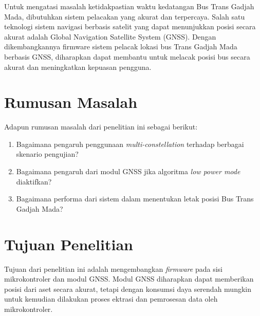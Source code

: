Untuk mengatasi masalah ketidakpastian waktu kedatangan Bus Trans Gadjah Mada, dibutuhkan sistem pelacakan yang akurat dan terpercaya. Salah satu teknologi sistem navigasi berbasis satelit yang dapat menunjukkan posisi secara akurat adalah Global Navigation Satellite System (GNSS). Dengan dikembangkannya firmware sistem pelacak lokasi bus Trans Gadjah Mada berbasis GNSS, diharapkan dapat membantu untuk melacak posisi bus secara akurat dan meningkatkan kepuasan pengguna.

\section{Rumusan Masalah}
Adapun rumusan masalah dari penelitian ini sebagai berikut:
\begin{enumerate}
	\item Bagaimana pengaruh penggunaan \textit{multi-constellation} terhadap berbagai skenario pengujian?
	\item Bagaimana pengaruh dari modul GNSS jika algoritma \textit{low power mode} diaktifkan?
	\item Bagaimana performa dari sistem dalam menentukan letak posisi Bus Trans Gadjah Mada?
\end{enumerate}

\section{Tujuan Penelitian}
Tujuan dari penelitian ini adalah mengembangkan \textit{firmware} pada sisi mikrokontroler dan modul GNSS. Modul GNSS diharapkan dapat memberikan posisi dari aset secara akurat, tetapi dengan konsumsi daya serendah mungkin untuk kemudian dilakukan proses ektrasi dan pemrosesan data oleh mikrokontroler.

